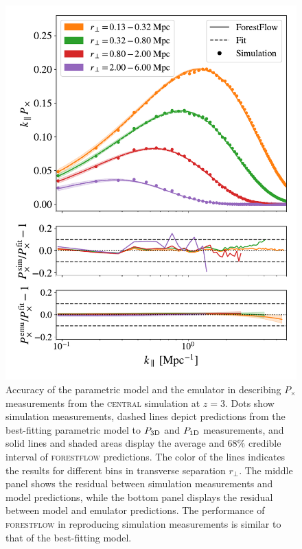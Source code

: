 \documentclass[longauth]{aa}
\newcommand{\pcross}{$P_{\times}$\xspace}
\newcommand{\poned}{\ensuremath{P_{\rm 1D}}\xspace}
\newcommand{\pthreed}{\ensuremath{P_{\rm 3D}}\xspace}
\newcommand{\forestflow}{\textsc{forestflow}\xspace}
\newcommand{\simcentral}{\textsc{central}\xspace}
\begin{document}
\begin{figure}
    \centering
    \includegraphics[width=.9\columnwidth]{figures/Pcross_central_snap6_kPx_allbin_emupred_first4_withfracerr.pdf}
    \caption{Accuracy of the parametric model and the emulator in describing \pcross measurements from the \simcentral simulation at $z=3$. Dots show simulation measurements, dashed lines depict predictions from the best-fitting parametric model to \pthreed and \poned measurements, and solid lines and shaded areas display the average and 68\% credible interval of \forestflow predictions. The color of the lines indicates the results for different bins in transverse separation $r_\perp$. The middle panel shows the residual between simulation measurements and model predictions, while the bottom panel displays the residual between model and emulator predictions. The performance of \forestflow in reproducing simulation measurements is similar to that of the best-fitting model.}
    \label{fig:Px_onesnap}
\end{figure}
\end{document}
